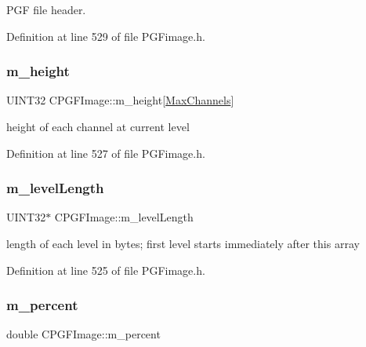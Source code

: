 P\+GF file header. 



Definition at line 529 of file P\+G\+Fimage.\+h.

\mbox{\label{classCPGFImage_a170fd448152303a2d44848a52a8916a0}} 
\subsubsection{\texorpdfstring{m\_height}{m\_height}}
{\footnotesize\ttfamily U\+I\+N\+T32 C\+P\+G\+F\+Image\+::m\+\_\+height\mbox{[}\mbox{\hyperlink{PGFtypes_8h_a94219182f88d4dbed1021ed04db75e41}{Max\+Channels}}\mbox{]}\hspace{0.3cm}{\ttfamily [protected]}}



height of each channel at current level 



Definition at line 527 of file P\+G\+Fimage.\+h.

\mbox{\label{classCPGFImage_a1635ef5dca13bd07276d112a72316a73}} 
\subsubsection{\texorpdfstring{m\_levelLength}{m\_levelLength}}
{\footnotesize\ttfamily U\+I\+N\+T32$\ast$ C\+P\+G\+F\+Image\+::m\+\_\+level\+Length\hspace{0.3cm}{\ttfamily [protected]}}



length of each level in bytes; first level starts immediately after this array 



Definition at line 525 of file P\+G\+Fimage.\+h.

\mbox{\label{classCPGFImage_adc2499451b8f96483a892e53fe5849b1}} 
\subsubsection{\texorpdfstring{m\_percent}{m\_percent}}
{\footnotesize\ttfamily double C\+P\+G\+F\+Image\+::m\+\_\+percent\hspace{0.3cm}{\ttfamily [private]}}



